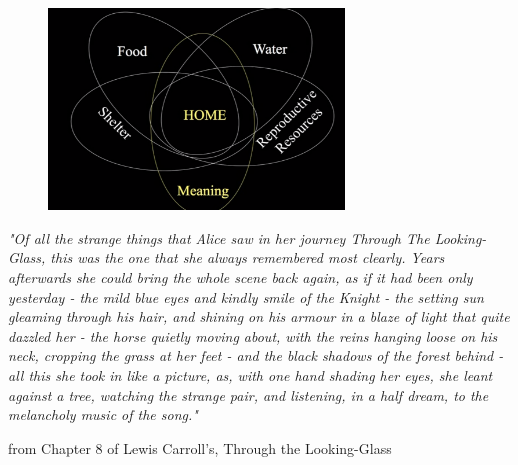\documentclass{article}
\begin{document}
\vspace{7mm}

\begin{figure}[h!]
\begin{center}
\includegraphics[width=0.7\textwidth]{home.png}

\end{center}
\end{figure}

\setlength{\leftskip}{0cm}

\normalsize{\textit{"Of all the strange things that Alice saw in her journey Through The Looking-Glass, this was the one that she always remembered most clearly. Years afterwards she could bring the whole scene back again, as if it had been only yesterday - the mild blue eyes and kindly smile of the Knight - the setting sun gleaming through his hair, and shining on his armour in a blaze of light that quite dazzled her - the horse quietly moving about, with the reins hanging loose on his neck, cropping the grass at her feet - and the black shadows of the forest behind - all this she took in like a picture, as, with one hand shading her eyes, she leant against a tree, watching the strange pair, and listening, in a half dream, to the melancholy music of the song."}
\begin{flushright}
\large{from Chapter 8 of Lewis Carroll's, Through the Looking-Glass}
\end{flushright}
}

\end{document}
